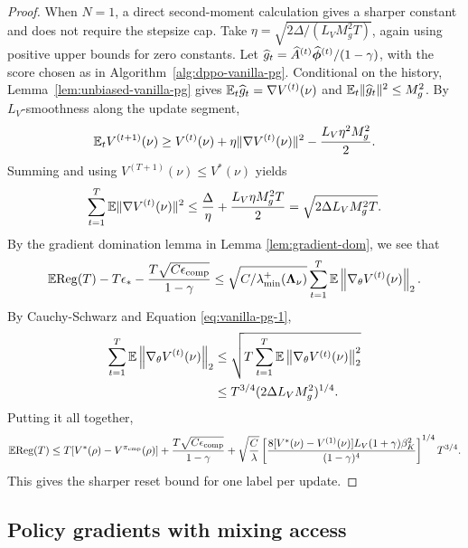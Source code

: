 \begin{proof}
When $N=1$, a direct second-moment calculation gives a sharper constant and does not require the stepsize cap. Take $\eta=\sqrt{2\Delta/(L_VM_g^2T)}$, again using positive upper bounds for zero constants.
Let $\widehat g_t=\widehat A^{(t)}\widehat{\boldsymbol{\phi}}^{(t)}/(1-\gamma)$, with the score
chosen as in Algorithm~\ref{alg:dppo-vanilla-pg}. Conditional on the history,
Lemma~\ref{lem:unbiased-vanilla-pg} gives
$\mathbb{E}_t\widehat g_t=\nabla V^{(t)}(\nu)$ and
$\mathbb{E}_t\|\widehat g_t\|^2\leq M_g^2$.
By $L_V$-smoothness along the update segment,
\[
\mathbb{E}_t V^{(t+1)}(\nu)
\geq V^{(t)}(\nu)+\eta\|\nabla V^{(t)}(\nu)\|^2
-\frac{L_V\eta^2M_g^2}{2}.
\]
Summing and using $V^{(T+1)}(\nu)\leq V^*(\nu)$ yields
\begin{equation}
\sum_{t=1}^T\mathbb{E}\|\nabla V^{(t)}(\nu)\|^2
\leq\frac\Delta\eta+\frac{L_V\eta M_g^2T}{2}
=\sqrt{2\Delta L_VM_g^2T}.
\label{eq:vanilla-pg-1}
\end{equation}
By the gradient domination lemma in Lemma \ref{lem:gradient-dom}, we see that
\[
\mathbb{E}\mathrm{Reg}(T)-T\epsilon_*-\frac{T\sqrt{C\epsilon_{\mathrm{comp}}}}{1-\gamma}
\leq\sqrt{C/\lambda_{\min}^+(\boldsymbol{\Lambda}_\nu)}
\sum_{t=1}^T\mathbb{E}\left\lVert\nabla_\theta V^{(t)}(\nu)\right\rVert_2.
\]
By Cauchy-Schwarz and Equation \ref{eq:vanilla-pg-1},
\begin{align*}
    \sum_{t=1}^T \mathbb{E}\left\lVert \nabla_\theta V^{(t)}(\nu) \right\rVert_2
    &\leq \sqrt{T \sum_{t=1}^T \mathbb{E} \left\lVert \nabla_\theta V^{(t)}(\nu) \right\rVert_2^2} \\
    &\leq T^{3/4}(2\Delta L_VM_g^2)^{1/4}.
\end{align*}
Putting it all together,
\[
\mathbb{E}\mathrm{Reg}(T)\leq
T[V^*(\rho)-V^{\pi_{\rm cmp}}(\rho)]
+\frac{T\sqrt{C\epsilon_{\rm comp}}}{1-\gamma}
+\sqrt{\frac C\lambda}
\left[\frac{8[V^*(\nu)-V^{(1)}(\nu)]L_V(1+\gamma)\beta_K^2}
{(1-\gamma)^4}\right]^{1/4}T^{3/4}.
\]
This gives the sharper reset bound for one label per update.
\end{proof}

\subsection{Policy gradients with mixing access}
\label{app:vanilla-pg-mixing}
